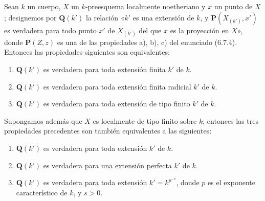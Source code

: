 \begin{proposition}[6.7.7]
\label{IV.2.s6.7.7-fr}
Sean $k$ un cuerpo, $X$ un $k$-preesquema localmente noetheriano y $x$ un
punto de $X$; designemos por $\boldsymbol{Q}(k')$ la relación «$k'$ es una extensión de
$k$, y $\boldsymbol{P}(X_{(k')},x')$ es verdadera para todo punto $x'$ de $X_{(k')}$ del
que $x$ es la proyección en $X$», donde $\boldsymbol{P}(Z,z)$ es una de las propiedades \textup{a),
b), c)} del enunciado \textup{(6.7.4)}. Entonces las propiedades siguientes son
equivalentes:
\begin{enumerate}
\item[\textup{a)}] $\boldsymbol{Q}(k')$ es verdadera para toda extensión finita $k'$ de $k$.
\item[\textup{b)}] $\boldsymbol{Q}(k')$ es verdadera para toda extensión finita radicial $k'$ de $k$.
\item[\textup{c)}] $\boldsymbol{Q}(k')$ es verdadera para toda extensión de tipo finito $k'$ de $k$.
\end{enumerate}
Supongamos además que $X$ es localmente de tipo finito sobre $k$; entonces las
tres propiedades precedentes son también equivalentes a las siguientes:
\begin{enumerate}
\item[\textup{d)}] $\boldsymbol{Q}(k')$ es verdadera para toda extensión $k'$ de $k$.
\item[\textup{e)}] $\boldsymbol{Q}(k')$ es verdadera para \textup{una} extensión perfecta $k'$ de $k$.
\item[\textup{f)}] $\boldsymbol{Q}(k')$ es verdadera para toda extensión $k'=k^{p^{-s}}$, donde $p$ es
el exponente característico de $k$, y $s>0$.
\end{enumerate}
\end{proposition}
